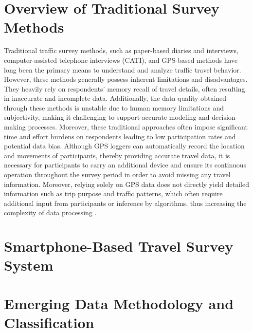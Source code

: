 \documentclass[12pt,two side]{report}
\begin{document}
\section{Overview of Traditional Survey Methods}
Traditional traffic survey methods, such as paper-based diaries and interviews, computer-assisted telephone interviews (CATI), and GPS-based methods have long been the primary means to understand and analyze traffic travel behavior\cite{alho2022online}\cite{cottrill2013future}\cite{hong2021insights}. However, these methods generally possess inherent limitations and disadvantages. They heavily rely on respondents' memory recall of travel details, often resulting in inaccurate and incomplete data\cite{hong2021insights}. Additionally, the data quality obtained through these methods is unstable due to human memory limitations and subjectivity, making it challenging to support accurate modeling and decision-making processes\cite{cottrill2013future}. Moreover, these traditional approaches often impose significant time and effort burdens on respondents leading to low participation rates and potential data bias\cite{cottrill2013future}. Although GPS loggers can automatically record the location and movements of participants, thereby providing accurate travel data, it is necessary for participants to carry an additional device and ensure its continuous operation throughout the survey period in order to avoid missing any travel information\cite{cottrill2013future}. Moreover, relying solely on GPS data does not directly yield detailed information such as trip purpose and traffic patterns, which often require additional input from participants or inference by algorithms, thus increasing the complexity of data processing \cite{hong2021insights}.

\section{Smartphone-Based Travel Survey System}
\section {Emerging Data Methodology and Classification}
\end{document}
